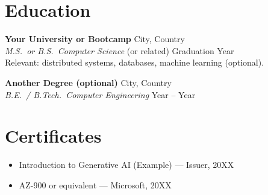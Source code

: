 \documentclass[10pt,letterpaper]{article}
\begin{document}
\section*{Education}
\textbf{Your University or Bootcamp} \hfill City, Country \\
\textit{M.S.\ or B.S.\ Computer Science} (or related) \hfill Graduation Year \\
{\small Relevant: distributed systems, databases, machine learning (optional).}

\vspace{0.35em}
\textbf{Another Degree (optional)} \hfill City, Country \\
\textit{B.E.\ / B.Tech.\ Computer Engineering} \hfill Year -- Year

\section*{Certificates}
{\small
\begin{itemize}[leftmargin=1.2em]
  \item %
  Introduction to Generative AI (Example) --- Issuer, 20XX
  \item AZ-900 or equivalent --- Microsoft, 20XX
\end{itemize}
}

\end{document}
